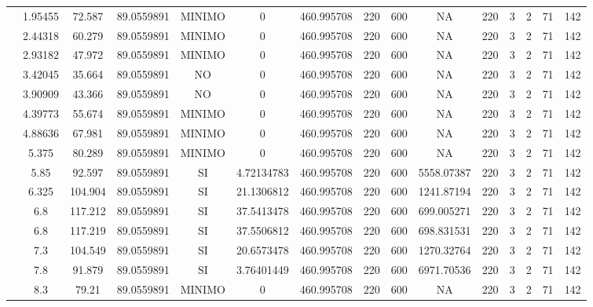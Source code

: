 \begin{table}[H]
{\begin{tabular}{|c|c|c|c|c|c|c|c|c|c|c|c|c|c|c|}
\cline{2-15}    & 1.95455 & 72.587 & 89.0559891 & MINIMO & 0   & 460.995708 & 220 & 600 & NA  & 220 & 3   & 2   & 71  & 142 \bigstrut\\
\cline{2-15}    & 2.44318 & 60.279 & 89.0559891 & MINIMO & 0   & 460.995708 & 220 & 600 & NA  & 220 & 3   & 2   & 71  & 142 \bigstrut\\
\cline{2-15}    & 2.93182 & 47.972 & 89.0559891 & MINIMO & 0   & 460.995708 & 220 & 600 & NA  & 220 & 3   & 2   & 71  & 142 \bigstrut\\
\cline{2-15}    & 3.42045 & 35.664 & 89.0559891 & NO  & 0   & 460.995708 & 220 & 600 & NA  & 220 & 3   & 2   & 71  & 142 \bigstrut\\
\cline{2-15}    & 3.90909 & 43.366 & 89.0559891 & NO  & 0   & 460.995708 & 220 & 600 & NA  & 220 & 3   & 2   & 71  & 142 \bigstrut\\
\cline{2-15}    & 4.39773 & 55.674 & 89.0559891 & MINIMO & 0   & 460.995708 & 220 & 600 & NA  & 220 & 3   & 2   & 71  & 142 \bigstrut\\
\cline{2-15}    & 4.88636 & 67.981 & 89.0559891 & MINIMO & 0   & 460.995708 & 220 & 600 & NA  & 220 & 3   & 2   & 71  & 142 \bigstrut\\
\cline{2-15}    & 5.375 & 80.289 & 89.0559891 & MINIMO & 0   & 460.995708 & 220 & 600 & NA  & 220 & 3   & 2   & 71  & 142 \bigstrut\\
\cline{2-15}    & 5.85 & 92.597 & 89.0559891 & SI  & 4.72134783 & 460.995708 & 220 & 600 & 5558.07387 & 220 & 3   & 2   & 71  & 142 \bigstrut\\
\cline{2-15}    & 6.325 & 104.904 & 89.0559891 & SI  & 21.1306812 & 460.995708 & 220 & 600 & 1241.87194 & 220 & 3   & 2   & 71  & 142 \bigstrut\\
\cline{2-15}    & 6.8 & 117.212 & 89.0559891 & SI  & 37.5413478 & 460.995708 & 220 & 600 & 699.005271 & 220 & 3   & 2   & 71  & 142 \bigstrut\\
\cline{2-15}    & 6.8 & 117.219 & 89.0559891 & SI  & 37.5506812 & 460.995708 & 220 & 600 & 698.831531 & 220 & 3   & 2   & 71  & 142 \bigstrut\\
\cline{2-15}    & 7.3 & 104.549 & 89.0559891 & SI  & 20.6573478 & 460.995708 & 220 & 600 & 1270.32764 & 220 & 3   & 2   & 71  & 142 \bigstrut\\
\cline{2-15}    & 7.8 & 91.879 & 89.0559891 & SI  & 3.76401449 & 460.995708 & 220 & 600 & 6971.70536 & 220 & 3   & 2   & 71  & 142 \bigstrut\\
\cline{2-15}    & 8.3 & 79.21 & 89.0559891 & MINIMO & 0   & 460.995708 & 220 & 600 & NA  & 220 & 3   & 2   & 71  & 142 \bigstrut\\

\end{tabular}}
\end{table}
